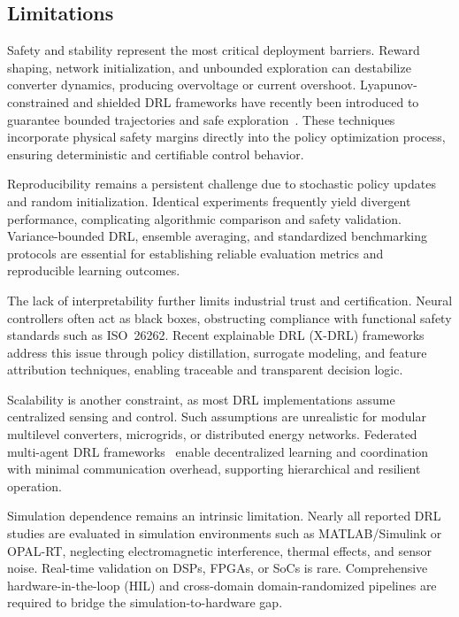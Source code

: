 \subsection{Limitations}

Safety and stability represent the most critical deployment barriers.  
Reward shaping, network initialization, and unbounded exploration can destabilize converter dynamics, producing overvoltage or current overshoot.  
Lyapunov-constrained and shielded DRL frameworks have recently been introduced to guarantee bounded trajectories and safe exploration~\cite{Feng2022StabilityCR,Shi2021StabilityCR,Cui2021DecentralizedSR}. These techniques incorporate physical safety margins directly into the policy optimization process, ensuring deterministic and certifiable control behavior.

Reproducibility remains a persistent challenge due to stochastic policy updates and random initialization.  
Identical experiments frequently yield divergent performance, complicating algorithmic comparison and safety validation.  
Variance-bounded DRL, ensemble averaging, and standardized benchmarking protocols are essential for establishing reliable evaluation metrics and reproducible learning outcomes.

The lack of interpretability further limits industrial trust and certification.  
Neural controllers often act as black boxes, obstructing compliance with functional safety standards such as ISO~26262.  
Recent explainable DRL (X-DRL) frameworks address this issue through policy distillation, surrogate modeling, and feature attribution techniques, enabling traceable and transparent decision logic.

Scalability is another constraint, as most DRL implementations assume centralized sensing and control.  
Such assumptions are unrealistic for modular multilevel converters, microgrids, or distributed energy networks.  
Federated multi-agent DRL frameworks~\cite{Li2022FederatedMD} enable decentralized learning and coordination with minimal communication overhead, supporting hierarchical and resilient operation.

Simulation dependence remains an intrinsic limitation.  
Nearly all reported DRL studies are evaluated in simulation environments such as MATLAB/Simulink or OPAL-RT, neglecting electromagnetic interference, thermal effects, and sensor noise.  
Real-time validation on DSPs, FPGAs, or SoCs is rare.  
Comprehensive hardware-in-the-loop (HIL) and cross-domain domain-randomized pipelines are required to bridge the simulation-to-hardware gap.

